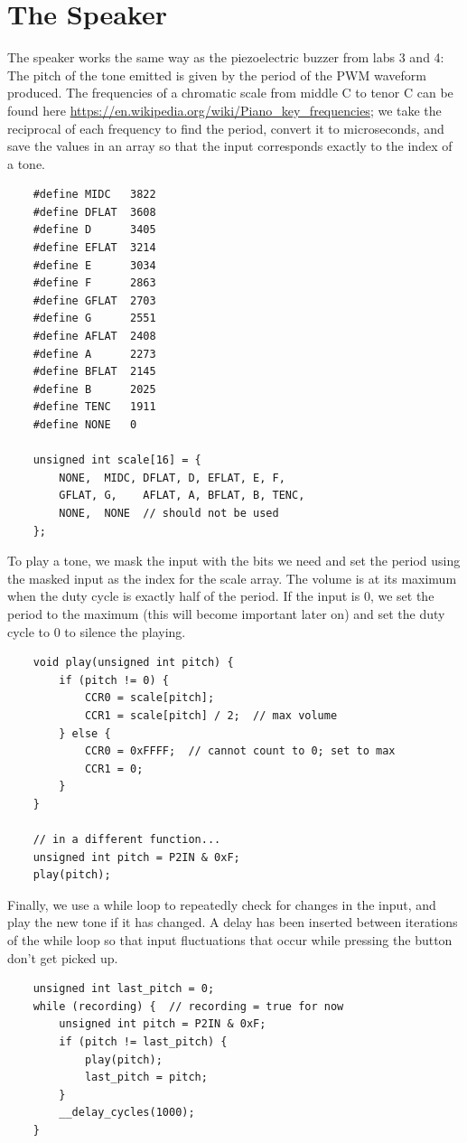\documentclass[letterpaper]{report}
\begin{document}
		\section{The Speaker}
			The speaker works the same way as the piezoelectric buzzer from labs 3 and 4: The pitch of the tone emitted is given by the period of the PWM waveform produced. The frequencies of a chromatic scale from middle C to tenor C can be found here \url{https://en.wikipedia.org/wiki/Piano_key_frequencies}; we take the reciprocal of each frequency to find the period, convert it to microseconds, and save the values in an array so that the input corresponds exactly to the index of a tone.
				\begin{verbatim}
    #define MIDC   3822
    #define DFLAT  3608
    #define D      3405
    #define EFLAT  3214
    #define E      3034
    #define F      2863
    #define GFLAT  2703
    #define G      2551
    #define AFLAT  2408
    #define A      2273
    #define BFLAT  2145
    #define B      2025
    #define TENC   1911
    #define NONE   0
    
    unsigned int scale[16] = {
        NONE,  MIDC, DFLAT, D, EFLAT, E, F, 
        GFLAT, G,    AFLAT, A, BFLAT, B, TENC,
        NONE,  NONE  // should not be used
    };
				\end{verbatim}
			To play a tone, we mask the input with the bits we need and set the period using the masked input as the index for the scale array. The volume is at its maximum when the duty cycle is exactly half of the period. If the input is 0, we set the period to the maximum (this will become important later on) and set the duty cycle to 0 to silence the playing.
				\begin{verbatim}				
    void play(unsigned int pitch) {
        if (pitch != 0) {
            CCR0 = scale[pitch];
            CCR1 = scale[pitch] / 2;  // max volume
        } else {
            CCR0 = 0xFFFF;  // cannot count to 0; set to max
            CCR1 = 0;
        }
    }
    
    // in a different function...
    unsigned int pitch = P2IN & 0xF;
    play(pitch);
				\end{verbatim}
			Finally, we use a while loop to repeatedly check for changes in the input, and play the new tone if it has changed. A delay has been inserted between iterations of the while loop so that input fluctuations that occur while pressing the button don't get picked up.
				\begin{verbatim}
    unsigned int last_pitch = 0;
    while (recording) {  // recording = true for now
        unsigned int pitch = P2IN & 0xF;
        if (pitch != last_pitch) {
            play(pitch);
            last_pitch = pitch;
        }
        __delay_cycles(1000);
    }
				\end{verbatim}
\end{document}
